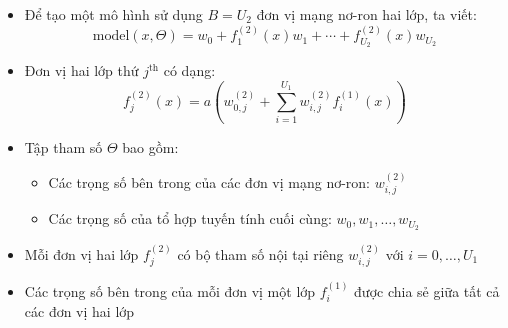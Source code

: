 \documentclass{book}
\begin{document}
    \begin{itemize}
        \item Để tạo một mô hình sử dụng \( B = U_2 \) đơn vị mạng nơ-ron hai lớp, ta viết:
        \[
        \text{model}(x, \Theta) = w_0 + f^{(2)}_1(x)w_1 + \cdots + f^{(2)}_{U_2}(x)w_{U_2}
        \]
        
        \item Đơn vị hai lớp thứ \( j^{\text{th}} \) có dạng:
        \[
        f^{(2)}_j(x) = a\left(w^{(2)}_{0,j} + \sum_{i=1}^{U_1} w^{(2)}_{i,j} f^{(1)}_i(x)\right)
        \]
        
        \item Tập tham số \( \Theta \) bao gồm:
        \begin{itemize}
            \item Các trọng số bên trong của các đơn vị mạng nơ-ron: \( w^{(2)}_{i,j} \)
            \item Các trọng số của tổ hợp tuyến tính cuối cùng: \( w_0, w_1, \ldots, w_{U_2} \)
        \end{itemize}
        
        \item Mỗi đơn vị hai lớp \( f^{(2)}_j \) có bộ tham số nội tại riêng \( w^{(2)}_{i,j} \) với \( i = 0, \ldots, U_1 \)
        
        \item Các trọng số bên trong của mỗi đơn vị một lớp \( f^{(1)}_i \) được chia sẻ giữa tất cả các đơn vị hai lớp
    \end{itemize}
\end{document}
